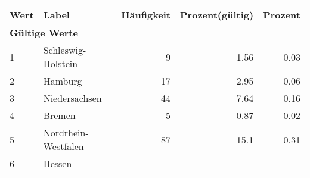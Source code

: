      \begin{longtable}{lXrrr}
     \toprule
     \textbf{Wert} & \textbf{Label} & \textbf{Häufigkeit} & \textbf{Prozent(gültig)} & \textbf{Prozent} \\
     \endhead
     \midrule
     \multicolumn{5}{l}{\textbf{Gültige Werte}}\\

     1 &
     \multicolumn{1}{X}{ Schleswig-Holstein   } &


       \num{9} &
       \num[round-mode=places,round-precision=2]{1,56} &
         \num[round-mode=places,round-precision=2]{0,03} \\

     2 &
     \multicolumn{1}{X}{ Hamburg   } &


       \num{17} &
       \num[round-mode=places,round-precision=2]{2,95} &
         \num[round-mode=places,round-precision=2]{0,06} \\

     3 &
     \multicolumn{1}{X}{ Niedersachsen   } &


       \num{44} &
       \num[round-mode=places,round-precision=2]{7,64} &
         \num[round-mode=places,round-precision=2]{0,16} \\

     4 &
     \multicolumn{1}{X}{ Bremen   } &


       \num{5} &
       \num[round-mode=places,round-precision=2]{0,87} &
         \num[round-mode=places,round-precision=2]{0,02} \\

     5 &
     \multicolumn{1}{X}{ Nordrhein-Westfalen   } &


       \num{87} &
       \num[round-mode=places,round-precision=2]{15,1} &
         \num[round-mode=places,round-precision=2]{0,31} \\

     6 &
     \multicolumn{1}{X}{ Hessen   } &



\end{longtable}
